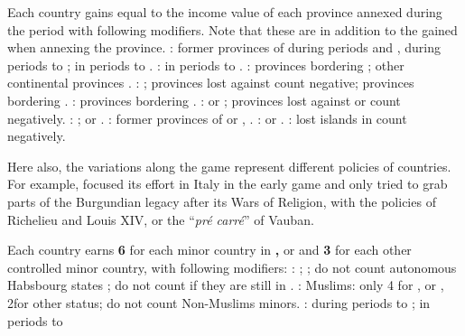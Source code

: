  Each country gains \VPs equal to the income value
of each province annexed during the period with following modifiers. Note that
these are in addition to the \VPs gained when annexing the province.
\bparag \FRA: former provinces of \paysBourgogne {} during
periods  and ,  during periods 
to ; \regionItalie {} in periods  to
.
\bparag \SPA: \regionItalie {} in periods  to
.
\bparag \ENG: provinces bordering \regionMediterranee {};
other continental provinces .
\bparag \TUR: \paysPerse {}; provinces lost against \paysPerse
count negative; provinces bordering \regionMediterranee {}.
\bparag \SUE: provinces bordering \regionBaltique {}.
\bparag \RUS: \POL or \paysPologne {} ; provinces lost against
\POL or \paysPologne count negatively.
\bparag \POL: \RUS {} ; \SUE or \paysSuede{}.
\bparag \AUT: former provinces of \paysHongrie or \paysMoldavie,
\provinceSerbia {}.
\bparag \PRU: \HRE or \paysPologne {}.
\bparag \VEN: lost islands in \regionMediterranee count negatively.

\begin{designnote}
  Here also, the variations along the game represent different policies of
  countries. For example, \FRA focused its effort in Italy in the early game
  and only tried to grab parts of the Burgundian legacy after its Wars of
  Religion, with the policies of Richelieu and Louis XIV, or the ``\emph{pré
    carré}'' of Vauban.
\end{designnote}

\bparag Each country earns {\bf 6 \VPs} for each minor country in {\bf
  \VASSAL, \ANNEXION} or {\bf \dipAT} and {\bf 3 \VPs} for each other
controlled minor country, with following modifiers:
\bparag \HIS: \regionItalie {}; \paysChevaliers {} ;
do not count autonomous Habsbourg states ; do not count \paysChevaliers if
they are still in \provinceRhodos.
\bparag \TUR: Muslims: only 4 \VPs for \VASSAL, \ANNEXION or \dipAT, 2\VPs for
other status; do not count Non-Muslims minors.
\bparag \FRA: \regionItalie{} during periods  to
 ; \HRE{} in periods  to 

